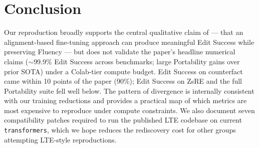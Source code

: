 \documentclass[11pt,a4paper,twocolumn]{article}
\begin{document}
\section*{Conclusion}
Our reproduction broadly supports the central qualitative claim of \citet{jiang2024learning} --- that an alignment-based fine-tuning approach can produce meaningful Edit Success while preserving Fluency --- but does not validate the paper's headline numerical claims ($\sim$99.9\% Edit Success across benchmarks; large Portability gains over prior SOTA) under a Colab-tier compute budget. Edit Success on counterfact came within 10 points of the paper (90\%); Edit Success on ZsRE and the full Portability suite fell well below. The pattern of divergence is internally consistent with our training reductions and provides a practical map of which metrics are most expensive to reproduce under compute constraints. We also document seven compatibility patches required to run the published LTE codebase on current \texttt{transformers}, which we hope reduces the rediscovery cost for other groups attempting LTE-style reproductions.


\end{document}
